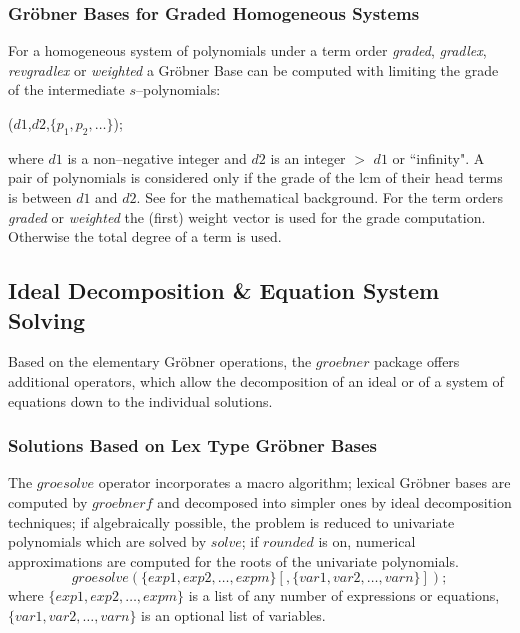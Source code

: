\subsubsection{Gr\"obner Bases for Graded Homogeneous Systems}

For a homogeneous system of polynomials under a term order
{\it graded}, {\it gradlex}, {\it revgradlex} or {\it weighted}
a Gr\"obner Base can be computed with limiting the grade
of the intermediate $s$--polynomials:
\begin{description}
\item [{\it dd\_groebner}]($d1$,$d2$,$\{p_1,p_2,\ldots\}$);
\end{description}
where $d1$ is a non--negative integer and $d2$ is an integer
$>$ $d1$ or ``infinity". A pair of polynomials is considered
only if the grade of the lcm of their head terms is between
$d1$ and $d2$. See \cite{Becker:93} for the mathematical background.
For the term orders {\it graded} or {\it weighted} the (first) weight
vector is used for the grade computation. Otherwise the total
degree of a term is used.

\subsection{Ideal Decomposition \& Equation System Solving}
Based on the elementary Gr\"obner operations, the $groebner$ package offers
additional operators, which allow the decomposition of an ideal or of a
system of equations down to the individual solutions.

\subsubsection{Solutions Based on Lex Type Gr\"obner Bases}

 
The $groesolve$ operator incorporates a macro algorithm;
lexical Gr\"obner bases are computed by $groebnerf$ and decomposed
into simpler ones by ideal decomposition techniques; if algebraically
possible, the problem is reduced to univariate polynomials which are
solved by $solve$; if $rounded$ is on, numerical approximations are
computed for the roots of the univariate polynomials.
\[
 groesolve(\{exp1, exp2, \ldots , expm\}[,\{var1, var2, \ldots ,
varn\}]); \]
where $\{exp1, exp2,\ldots , expm\}$ is a list of any number of
expressions or equations, $\{var1, var2, \ldots , varn\}$ is an
optional list of variables.

